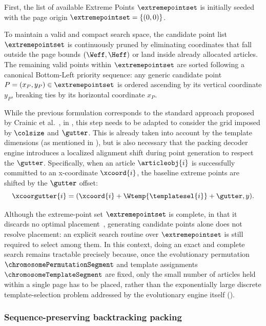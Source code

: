 First, the list of available Extreme Points $\extremepointset$ is initially seeded with the page origin $\extremepointset = \{(0,0)\}$.

To maintain a valid and compact search space, the candidate point list $\extremepointset$ is continuously pruned by eliminating coordinates that fall outside the page bounds $(\Weff, \Heff)$ or land inside already allocated articles. The remaining valid points within $\extremepointset$ are sorted following a canonical Bottom-Left priority sequence: any generic candidate point $P = (x_P, y_P) \in \extremepointset$ is ordered ascending by its vertical coordinate $y_P$, breaking ties by its horizontal coordinate $x_P$.

While the previous formulation corresponds to the standard approach proposed by Crainic et al.~\cite{crainic-extreme-points}, in \methodName, this step needs to be adapted to consider the grid imposed by $\colsize$ and $\gutter$. This is already taken into account by the template dimensions (as mentioned in ), but is also necessary that the packing decoder engine introduces a localized alignment shift during point generation to respect the $\gutter$. Specifically, when an article $\articleobj{i}$ is successfully committed to an x-coordinate $\xcoord{i}$, the baseline extreme points are shifted by the $\gutter$ offset:
\begin{equation}
\xcoorgutter{i} = (\xcoord{i} + \Wtemp{\templatesel{i}} + \gutter, y).
\end{equation}



Although the extreme-point set $\extremepointset$ is complete, in that it discards no optimal placement~\cite{lodi-packing-survey}, generating candidate points alone does not resolve placement: an explicit search routine over $\extremepointset$ is still required to select among them. In this context, doing an exact and complete search remains tractable precisely because, once the evolutionary permutation $\chromosomePermutationSegment$ and template assignments $\chromosomeTemplateSegment$ are fixed, only the small number of articles held within a single page has to be placed, rather than the exponentially large discrete template-selection problem addressed by the evolutionary engine itself ().

\subsubsection{Sequence-preserving backtracking packing}


